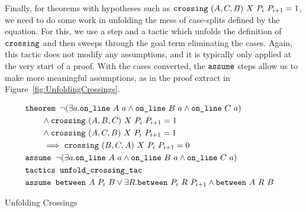 Finally, for theorems with hypotheses such as $\texttt{crossing}\ (A,C,B)\ X\ P_i\ P_{i+1} = 1$, we need to do some work in unfolding the mess of case-splits defined by the equation. For this, we use a  step and a tactic  which unfolds the definition of $\texttt{crossing}$ and then sweeps through the goal term eliminating the cases. Again, this tactic does not modify any assumptions, and it is typically only applied at the very start of a proof. With the cases converted, the $\texttt{assume}$ steps allow us to make more meaningful assumptions, as in the proof extract in Figure~\ref{fig:UnfoldingCrossings}.

\begin{boxedfigure}
\small
\begin{align*}
&\texttt{theorem } \neg(\exists a.\texttt{on\_line}\ A\ a\wedge \texttt{on\_line}\ B\ a\wedge \texttt{on\_line}\ C\ a) &\\
&\qquad\wedge \texttt{crossing}\ (A,B,C)\ X\ P_i\ P_{i+1} = 1&\\
&\qquad\wedge \texttt{crossing}\ (A,C,B)\ X\ P_i\ P_{i+1} = 1&\\
&\qquad\implies \texttt{crossing}\ (B,C,A)\ X\ P_i\ P_{i+1} = 0&\\
&\texttt{assume } \neg(\exists a.\texttt{on\_line}\ A\ a\wedge \texttt{on\_line}\ B\ a\wedge \texttt{on\_line}\ C\ a)&\\
&\texttt{tactics } \texttt{unfold\_crossing\_tac}&\\
&\texttt{assume } \texttt{between}\ A\ P_i\ B \vee \exists R. \texttt{between}\ P_i\ R\ P_{i+1} \wedge \texttt{between}\ A\ R\ B
\end{align*}
\caption{Unfolding Crossings}
\label{fig:UnfoldingCrossings}
\end{boxedfigure}




